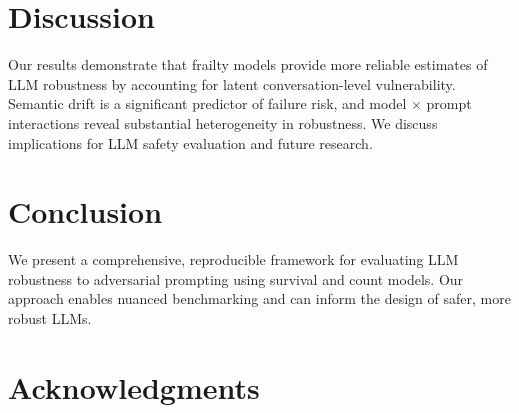 \documentclass[letterpaper]{article}
\begin{document}

\section{Discussion}
Our results demonstrate that frailty models provide more reliable estimates of LLM robustness by accounting for latent conversation-level vulnerability. Semantic drift is a significant predictor of failure risk, and model $\times$ prompt interactions reveal substantial heterogeneity in robustness. We discuss implications for LLM safety evaluation and future research.

\section{Conclusion}
We present a comprehensive, reproducible framework for evaluating LLM robustness to adversarial prompting using survival and count models. Our approach enables nuanced benchmarking and can inform the design of safer, more robust LLMs.

\section*{Acknowledgments}



\end{document}
